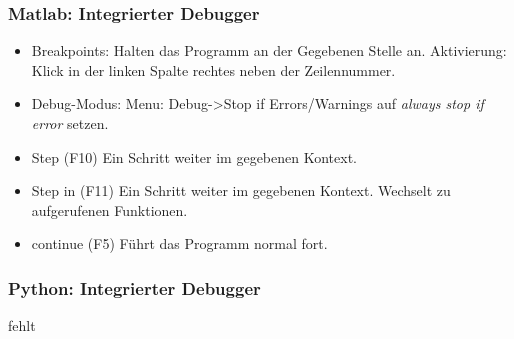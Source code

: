 \documentclass[hyperref={xetex}]{beamer}
\begin{document}
\begin{frame}[fragile]\frametitle{Matlab: Integrierter Debugger}
\begin{itemize}
 \item \alert{Breakpoints}: Halten das Programm an der Gegebenen Stelle an. Aktivierung: Klick in der linken Spalte rechtes neben der Zeilennummer. 
 \item \alert{Debug-Modus}: Menu: Debug->Stop if Errors/Warnings auf \textit{always stop if error} setzen.
 \item \alert{Step} (F10) Ein Schritt weiter im gegebenen Kontext.
 \item \alert{Step in} (F11) Ein Schritt weiter im gegebenen Kontext. Wechselt zu aufgerufenen Funktionen. 
\item \alert{continue} (F5) Führt das Programm normal fort.
\end{itemize}
\end{frame}


\begin{frame}[fragile]\frametitle{Python: Integrierter Debugger}
fehlt
\end{frame}
\end{document}
